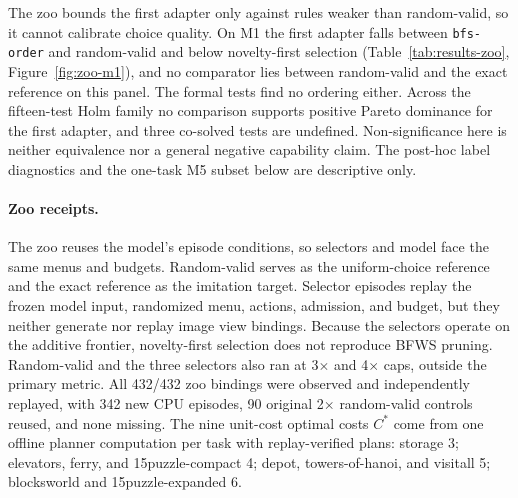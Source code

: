The zoo bounds the first adapter only against rules weaker than random-valid, so it cannot calibrate choice quality. On M1 the first adapter falls between \texttt{bfs-order} and random-valid and below novelty-first selection (Table~\ref{tab:results-zoo}, Figure~\ref{fig:zoo-m1}), and no comparator lies between random-valid and the exact reference on this panel. The formal tests find no ordering either. Across the fifteen-test Holm family no comparison supports positive Pareto dominance for the first adapter, and three co-solved tests are undefined. Non-significance here is neither equivalence nor a general negative capability claim. The post-hoc label diagnostics and the one-task M5 subset below are descriptive only.

\paragraph{Zoo receipts.}
The zoo reuses the model's episode conditions, so selectors and model face the same menus and budgets. Random-valid serves as the uniform-choice reference and the exact reference as the imitation target. Selector episodes replay the frozen model input, randomized menu, actions, admission, and budget, but they neither generate nor replay image view bindings. Because the selectors operate on the additive frontier, novelty-first selection does not reproduce BFWS pruning. Random-valid and the three selectors also ran at 3$\times$ and 4$\times$ caps, outside the primary metric. All 432/432 zoo bindings were observed and independently replayed, with 342 new CPU episodes, 90 original 2$\times$ random-valid controls reused, and none missing. The nine unit-cost optimal costs $C^*$ come from one offline planner computation per task with replay-verified plans: storage 3; elevators, ferry, and 15puzzle-compact 4; depot, towers-of-hanoi, and visitall 5; blocksworld and 15puzzle-expanded 6.

